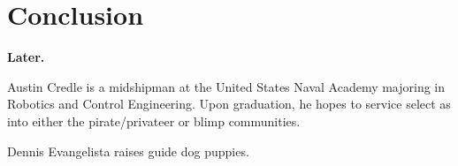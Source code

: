 \documentclass[onecolumn,10pt]{IEEEtran}
\newcommand{\myroot}{../}
\newcommand{\Later}{\textbf{Later.}}
\begin{document}
\section{Conclusion}
\Later




%
%

\begin{IEEEbiography}{Austin Credle} is a midshipman at the United States Naval Academy majoring in Robotics and Control Engineering. Upon graduation, he hopes to service select as into either the pirate/privateer or blimp communities. 
\end{IEEEbiography}

\begin{IEEEbiography}{Dennis Evangelista} raises guide dog puppies. 
\end{IEEEbiography}
\end{document}
